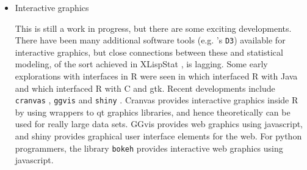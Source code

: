 \documentclass{article}
\begin{document}
\begin{itemize}
\item Interactive graphics

This is still a work in progress, but there are some exciting developments. There have been many additional software tools (e.g. \citet{Bostock:2011}'s  {\tt D3}) available for interactive graphics, but close connections between these and statistical modeling, of the sort achieved in XLispStat \citep{Ti91}, is lagging. Some early explorations with interfaces in R were seen in \citet{iplots} which interfaced R with Java and \citet{rggobi-rnews} which interfaced R with C and gtk. Recent developments include {\tt cranvas} \citep{xie2014reactive}, {\tt ggvis} \citep{ggvis} and {\tt shiny} \citep{shiny}.  Cranvas provides interactive graphics inside R by using wrappers to qt graphics libraries, and hence theoretically can be used for really large data sets. GGvis provides web graphics using javascript, and shiny provides graphical user interface elements for the web. For python programmers, the library {\tt bokeh} \citep{bokeh} provides interactive web graphics using javascript.

\end{itemize}

\end{document}

